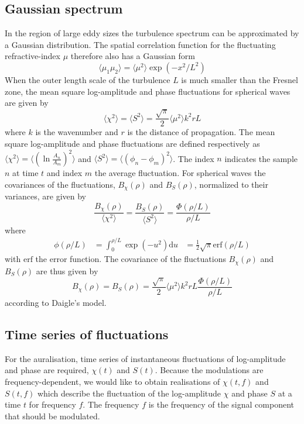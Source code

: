 \subsection{Gaussian spectrum}
In the region of large eddy sizes the turbulence spectrum can be approximated by a Gaussian distribution.
The spatial correlation function for the fluctuating refractive-index $\mu$ therefore also has a Gaussian form
\begin{equation}
 \langle \mu_1 \mu_2 \rangle = \langle \mu^2 \rangle \exp{\left( -x^2 / L^2 \right)}
\end{equation}
When the outer length scale of the turbulence $L$ is much smaller than the Fresnel zone, 
the mean square log-amplitude and phase fluctuations for spherical waves are given by
\begin{equation}\label{eq:model_daigle}
 \langle \chi^2 \rangle = \langle S^2 \rangle = \frac{\sqrt{\pi}}{2} \langle \mu^2 \rangle k^2 r L 
\end{equation}
where $k$ is the wavenumber and $r$ is the distance of propagation.
The mean square log-amplitude and phase fluctuations are defined respectively as $\langle \chi^2 \rangle = \langle \left( \ln{\frac{A_{n}}{A_{m}}} \right) ^2 \rangle $
and $ \langle S^2 \rangle = \langle \left( \phi_n - \phi_m \right)^2  \rangle$. The index $n$ indicates the sample $n$ at time $t$ and index $m$ the average fluctuation.
For spherical waves the covariances of the fluctuations, $B_{\chi}(\rho)$ and $B_{S}(\rho)$, normalized to their variances, are given by
\begin{equation}
 \frac{B_{\chi} (\rho)}{\langle \chi^2 \rangle} = \frac{B_{S} (\rho)}{\langle S^2 \rangle} = \frac{\Phi\left(\rho/L\right)}{\rho/L}
\end{equation}
where 
\begin{align}
 \phi \left(\rho/L \right) &= \int_0^{\rho/L} \exp{\left(-u^2\right)} \mathrm{d} u 
 &= \frac{1}{2} \sqrt{\pi} \mathrm{erf}\left( \rho/L \right)
\end{align}
with $\mathrm{erf}$ the error function.
The covariance of the fluctuations $B_{\chi}(\rho)$ and $B_{S}(\rho)$ are thus given by
\begin{equation}
 B_{\chi} (\rho) = B_{S}(\rho) = \frac{\sqrt{\pi}}{2}  \langle \mu^2  \rangle k^2 r L 
\frac{\Phi(\rho/L) }{\rho / L}
\end{equation}
according to Daigle's model.

\subsection{Time series of fluctuations}
For the auralisation, time series of instantaneous fluctuations of log-amplitude and phase are required, $\chi(t)$ and $S(t)$.
Because the modulations are frequency-dependent, we would like to obtain realisations of $\chi(t, f)$ and $S(t, f)$ which describe the fluctuation of the log-amplitude $\chi$ and phase $S$ at a time $t$ for frequency $f$.
The frequency $f$ is the frequency of the signal component that should be modulated.

